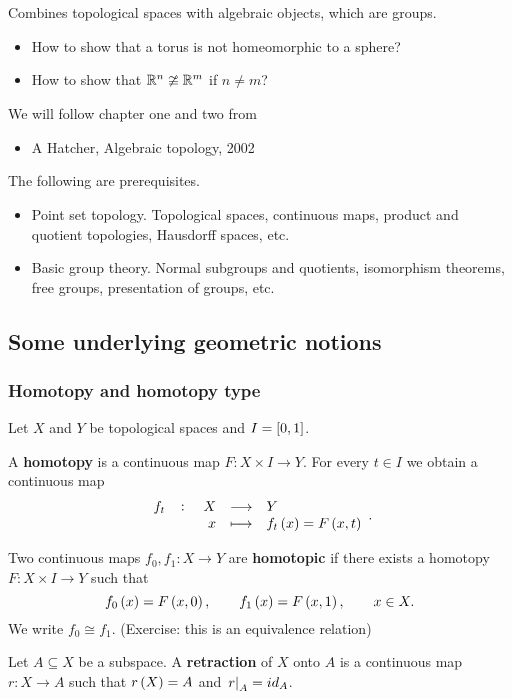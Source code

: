 Combines topological spaces with algebraic objects, which are groups.
\begin{itemize}
\item How to show that a torus is not homeomorphic to a sphere?
\item How to show that $ \mathbb{R}^n \ncong \mathbb{R}^m $ if $ n \ne m $?
\end{itemize}
We will follow chapter one and two from
\begin{itemize}
\item A Hatcher, Algebraic topology, 2002
\end{itemize}
The following are prerequisites.
\begin{itemize}
\item Point set topology. Topological spaces, continuous maps, product and quotient topologies, Hausdorff spaces, etc.
\item Basic group theory. Normal subgroups and quotients, isomorphism theorems, free groups, presentation of groups, etc.
\end{itemize}

\pagebreak

\subsection{Some underlying geometric notions}

\subsubsection{Homotopy and homotopy type}

Let $ X $ and $ Y $ be topological spaces and $ I = \sbr{0, 1} $.

\begin{definition*}
A \textbf{homotopy} is a continuous map $ F : X \times I \to Y $. For every $ t \in I $ we obtain a continuous map
$$ \function[f_t]{X}{Y}{x}{f_t\br{x} = F\br{x, t}}. $$
\end{definition*}

\begin{definition*}
Two continuous maps $ f_0, f_1 : X \to Y $ are \textbf{homotopic} if there exists a homotopy $ F : X \times I \to Y $ such that
$$ f_0\br{x} = F\br{x, 0}, \qquad f_1\br{x} = F\br{x, 1}, \qquad x \in X. $$
We write $ f_0 \cong f_1 $. (Exercise: this is an equivalence relation)
\end{definition*}

\begin{definition*}
Let $ A \subseteq X $ be a subspace. A \textbf{retraction} of $ X $ onto $ A $ is a continuous map $ r : X \to A $ such that $ r\br{X} = A $ and $ \left. r \right|_A = id_A $.
\end{definition*}

